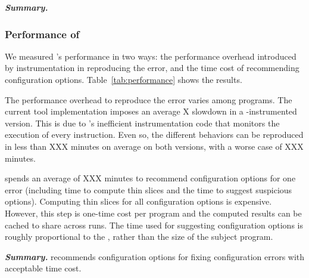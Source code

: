 \noindent \textbf{\textit{Summary.}}

\subsubsection{Performance of \ourtool}
\label{sec:timecost}

We measured \ourtool's performance in two ways:
the performance overhead introduced by instrumentation
in reproducing the error, and the time cost
of recommending configuration options.
Table~\ref{tab:performance} shows the results.

The performance overhead to reproduce the error
varies among programs. The current tool implementation
imposes an average X slowdown in a
\ourtool-instrumented version. This is due to
\ourtool's inefficient instrumentation code that
monitors the execution of every instruction.
Even so, the different behaviors can be reproduced
in less than XXX minutes on average on both versions, 
with a worse case of XXX minutes.


\ourtool spends an average of XXX minutes
to recommend configuration options for one
error (including time to compute thin slices
and the time to suggest suspicious options). 
Computing thin slices for all configuration options
is expensive. However, this step is one-time cost
per program and the computed results can
be cached to share across runs. 
The time used for suggesting configuration options
is roughly proportional to the ,
rather than the size of the subject program.

\vspace{1mm}
\noindent \textbf{\textit{Summary.}} \ourtool
recommends configuration options for fixing
configuration errors with acceptable time cost.

